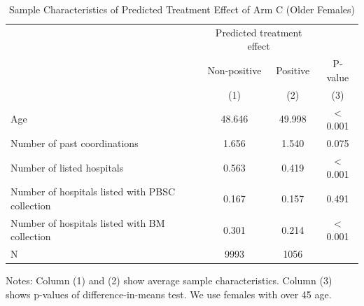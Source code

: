 \documentclass[
]{article}
\begin{document}
\begin{table}[H]

\caption{\label{tab:rcf-older-female}Sample Characteristics of Predicted Treatment Effect of Arm C (Older Females)}
\centering
\fontsize{9}{11}\selectfont
\fontsize{9}{11}\selectfont
\begin{threeparttable}
\begin{tabular}[t]{lccc}
\toprule
\multicolumn{1}{c}{ } & \multicolumn{2}{c}{Predicted treatment effect} & \multicolumn{1}{c}{ } \\
\cmidrule(l{3pt}r{3pt}){2-3}
\multicolumn{1}{c}{ } & \multicolumn{1}{c}{Non-positive} & \multicolumn{1}{c}{Positive} & \multicolumn{1}{c}{P-value} \\
\cmidrule(l{3pt}r{3pt}){2-2} \cmidrule(l{3pt}r{3pt}){3-3} \cmidrule(l{3pt}r{3pt}){4-4}
 & (1) & (2) & (3)\\
\midrule
Age & 48.646 & 49.998 & < 0.001\\
Number of past coordinations & 1.656 & 1.540 & 0.075\\
Number of listed hospitals & 0.563 & 0.419 & < 0.001\\
Number of hospitals listed with PBSC collection & 0.167 & 0.157 & 0.491\\
Number of hospitals listed with BM collection & 0.301 & 0.214 & < 0.001\\
N & 9993 & 1056 & \\
\bottomrule
\end{tabular}
\begin{tablenotes}
\item Notes: Column (1) and (2) show average sample characteristics. Column (3) shows p-values of difference-in-means test. We use females with over 45 age.
\end{tablenotes}
\end{threeparttable}
\end{table}

\clearpage

\renewcommand\refname{References}
  
\end{document}
